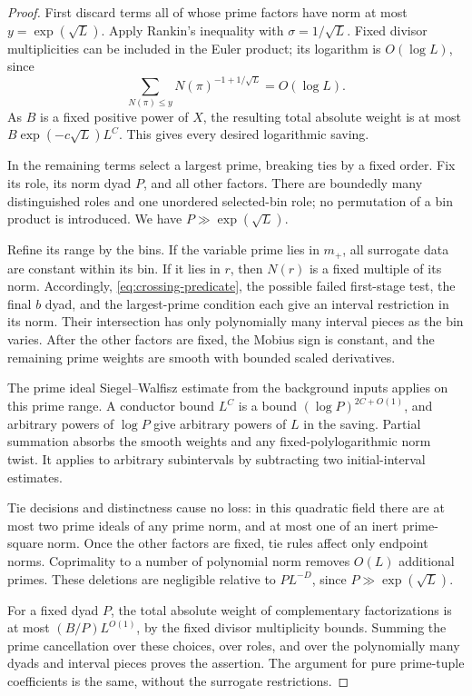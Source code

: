 \begin{proof}
First discard terms all of whose prime factors have norm at most
$y=\exp(\sqrt L)$.  Apply Rankin's inequality with
$\sigma=1/\sqrt L$.  Fixed divisor multiplicities can be included in
the Euler product; its logarithm is $O(\log L)$, since
\[
 \sum_{N(\pi)\le y}N(\pi)^{-1+1/\sqrt L}=O(\log L).
\]
As $B$ is a fixed positive power of $X$, the resulting total absolute
weight is at most $B\exp(-c\sqrt L)L^C$.  This gives every desired
logarithmic saving.

In the remaining terms select a largest prime, breaking ties by a
fixed order.  Fix its role, its norm dyad $P$, and all other factors.
There are boundedly many distinguished roles and one unordered
selected-bin role; no permutation of a bin product is introduced.
We have $P\gg\exp(\sqrt L)$.

Refine its range by the bins.  If the variable prime lies in $m_+$,
all surrogate data are constant within its bin.  If it lies in $r$,
then $N(r)$ is a fixed multiple of its norm.  Accordingly,
\eqref{eq:crossing-predicate}, the possible failed first-stage test,
the final $b$ dyad, and the largest-prime condition each give an
interval restriction in its norm.  Their intersection has only
polynomially many interval pieces as the bin varies.  After the
other factors are fixed, the Mobius sign is constant, and the remaining
prime weights are smooth with bounded scaled derivatives.

The prime ideal Siegel--Walfisz estimate from the background inputs
applies on this prime range.  A conductor bound $L^C$ is a bound
$(\log P)^{2C+O(1)}$, and arbitrary powers of $\log P$ give arbitrary
powers of $L$ in the saving.  Partial summation absorbs the smooth
weights and any fixed-polylogarithmic norm twist.  It applies to
arbitrary subintervals by subtracting two initial-interval estimates.

Tie decisions and distinctness cause no loss: in this quadratic field
there are at most two prime ideals of any prime norm, and at most one
of an inert prime-square norm.  Once the other factors are fixed,
tie rules affect only endpoint norms.  Coprimality to a number of
polynomial norm removes $O(L)$ additional primes.  These deletions
are negligible relative to $P L^{-D}$, since
$P\gg\exp(\sqrt L)$.

For a fixed dyad $P$, the total absolute weight of complementary
factorizations is at most $(B/P)L^{O(1)}$, by the fixed divisor
multiplicity bounds.  Summing the prime cancellation over these
choices, over roles, and over the polynomially many dyads and interval
pieces proves the assertion.  The argument for pure prime-tuple
coefficients is the same, without the surrogate restrictions.
\end{proof}

